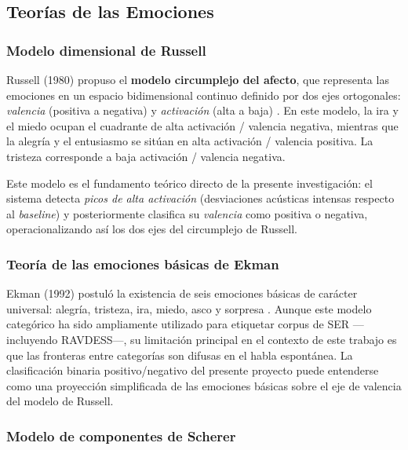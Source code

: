 \subsection{Teorías de las Emociones}
\label{sec:rt_teorias}

\subsubsection{Modelo dimensional de Russell}

Russell (1980) propuso el \textbf{modelo circumplejo del afecto}, que representa las
emociones en un espacio bidimensional continuo definido por dos ejes ortogonales:
\textit{valencia} (positiva a negativa) y \textit{activación} (alta a baja)
\cite{russell1980circumplex}. En este modelo, la ira y el miedo ocupan el cuadrante
de alta activación / valencia negativa, mientras que la alegría y el entusiasmo se
sitúan en alta activación / valencia positiva. La tristeza corresponde a baja
activación / valencia negativa.

Este modelo es el fundamento teórico directo de la presente investigación: el sistema
detecta \textit{picos de alta activación} (desviaciones acústicas intensas respecto
al \textit{baseline}) y posteriormente clasifica su \textit{valencia} como positiva
o negativa, operacionalizando así los dos ejes del circumplejo de Russell.

\subsubsection{Teoría de las emociones básicas de Ekman}

Ekman (1992) postuló la existencia de seis emociones básicas de carácter universal:
alegría, tristeza, ira, miedo, asco y sorpresa \cite{ekman1992basic}. Aunque este
modelo categórico ha sido ampliamente utilizado para etiquetar corpus de SER ---incluyendo
RAVDESS---, su limitación principal en el contexto de este trabajo es que las fronteras
entre categorías son difusas en el habla espontánea. La clasificación binaria positivo/negativo
del presente proyecto puede entenderse como una proyección simplificada de las emociones
básicas sobre el eje de valencia del modelo de Russell.

\subsubsection{Modelo de componentes de Scherer}

